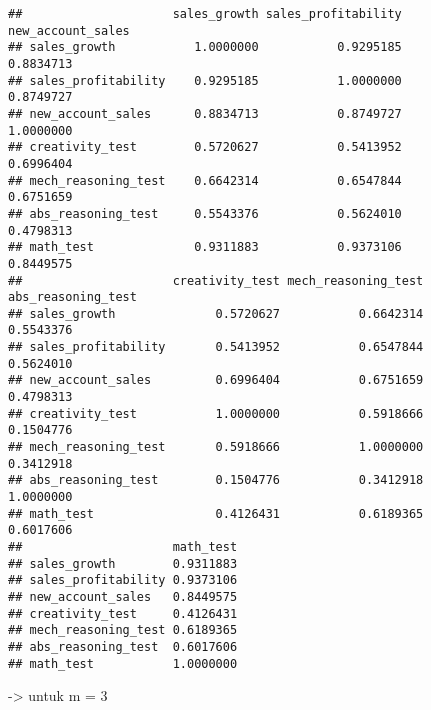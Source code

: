 \documentclass[
]{article}
\newenvironment{Shaded}{\begin{snugshade}}{\end{snugshade}}
\newcommand{\DecValTok}[1]{\textcolor[rgb]{0.00,0.00,0.81}{#1}}
\newcommand{\FunctionTok}[1]{\textcolor[rgb]{0.00,0.00,0.00}{#1}}
\newcommand{\NormalTok}[1]{#1}
\newcommand{\SpecialCharTok}[1]{\textcolor[rgb]{0.00,0.00,0.00}{#1}}
\begin{document}
\begin{verbatim}
##                     sales_growth sales_profitability new_account_sales
## sales_growth           1.0000000           0.9295185         0.8834713
## sales_profitability    0.9295185           1.0000000         0.8749727
## new_account_sales      0.8834713           0.8749727         1.0000000
## creativity_test        0.5720627           0.5413952         0.6996404
## mech_reasoning_test    0.6642314           0.6547844         0.6751659
## abs_reasoning_test     0.5543376           0.5624010         0.4798313
## math_test              0.9311883           0.9373106         0.8449575
##                     creativity_test mech_reasoning_test abs_reasoning_test
## sales_growth              0.5720627           0.6642314          0.5543376
## sales_profitability       0.5413952           0.6547844          0.5624010
## new_account_sales         0.6996404           0.6751659          0.4798313
## creativity_test           1.0000000           0.5918666          0.1504776
## mech_reasoning_test       0.5918666           1.0000000          0.3412918
## abs_reasoning_test        0.1504776           0.3412918          1.0000000
## math_test                 0.4126431           0.6189365          0.6017606
##                     math_test
## sales_growth        0.9311883
## sales_profitability 0.9373106
## new_account_sales   0.8449575
## creativity_test     0.4126431
## mech_reasoning_test 0.6189365
## abs_reasoning_test  0.6017606
## math_test           1.0000000
\end{verbatim}

-\textgreater{} untuk m = 3

\begin{Shaded}
\end{Shaded}
\end{document}
